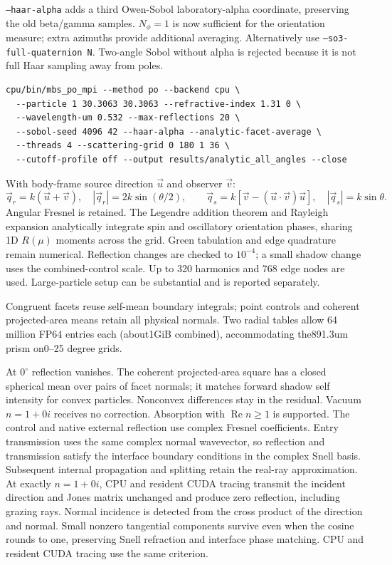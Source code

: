 \documentclass[
  10pt,
  a4paper,
]{article}
\begin{document}
\texttt{--haar-alpha} adds a third Owen-Sobol laboratory-alpha coordinate,
preserving the old beta/gamma samples. $N_\phi=1$ is now sufficient for the
orientation measure; extra azimuths provide additional averaging.
Alternatively use \texttt{--so3-full-quaternion N}. Two-angle Sobol without
alpha is rejected because it is not full Haar sampling away from poles.

\begin{verbatim}
cpu/bin/mbs_po_mpi --method po --backend cpu \
  --particle 1 30.3063 30.3063 --refractive-index 1.31 0 \
  --wavelength-um 0.532 --max-reflections 20 \
  --sobol-seed 4096 42 --haar-alpha --analytic-facet-average \
  --threads 4 --scattering-grid 0 180 1 36 \
  --cutoff-profile off --output results/analytic_all_angles --close
\end{verbatim}

With body-frame source direction $\vec u$ and observer $\vec v$:
\[
 \vec q_r=k(\vec u+\vec v),\quad |\vec q_r|=2k\sin(\theta/2),
 \qquad \vec q_s=k[\vec v-(\vec u\cdot\vec v)\vec u],\quad |\vec q_s|=k\sin\theta.
\]
Angular Fresnel is retained. The Legendre addition theorem and Rayleigh
expansion analytically integrate spin and oscillatory orientation phases,
sharing 1D $R(\mu)$ moments across the grid. Green tabulation and edge quadrature
remain numerical. Reflection changes are checked to $10^{-4}$; a small shadow
change uses the combined-control scale. Up to 320 harmonics and 768 edge nodes
are used. Large-particle setup can be substantial and is reported separately.

Congruent facets reuse self-mean boundary integrals; point controls and coherent
projected-area means retain all physical normals. Two radial tables allow
64 million FP64 entries each (about1GiB combined), accommodating the891.3um
prism on0--25 degree grids.

At $0^\circ$ reflection vanishes. The coherent projected-area square has a
closed spherical mean over pairs of facet normals; it matches forward shadow
self intensity for convex particles. Nonconvex differences stay in the residual.
Vacuum $n=1+0i$ receives no correction. Absorption with $\operatorname{Re}n\geq1$
is supported. The control and native external reflection use complex Fresnel
coefficients. Entry transmission uses the same complex normal wavevector, so
reflection and transmission satisfy the interface boundary conditions in the
complex Snell basis. Subsequent internal propagation and splitting retain the
real-ray approximation.
At exactly $n=1+0i$, CPU and resident CUDA tracing transmit the incident direction
and Jones matrix unchanged and produce zero reflection, including grazing rays.
Normal incidence is detected from the cross product of the direction and normal.
Small nonzero tangential components survive even when the cosine rounds to one,
preserving Snell refraction and interface phase matching. CPU and resident CUDA
tracing use the same criterion.
\end{document}
